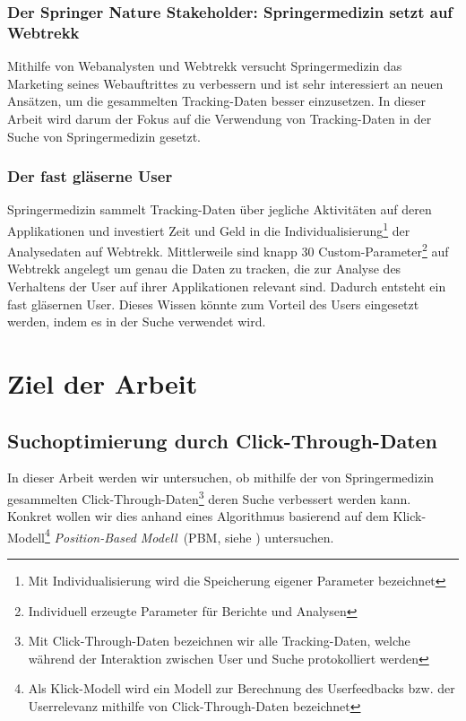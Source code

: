 \subsubsection{Der Springer Nature Stakeholder: Springermedizin setzt auf Webtrekk}
\label{sec:Einfuehrung:Problemstellung:Springermedizin}

Mithilfe von Webanalysten und Webtrekk versucht Springermedizin das Marketing seines Webauftrittes zu verbessern und ist sehr interessiert an neuen Ansätzen, um die gesammelten Tracking-Daten besser einzusetzen. In dieser Arbeit wird darum der Fokus auf die Verwendung von Tracking-Daten in der Suche von Springermedizin gesetzt. 
 
\subsubsection{Der fast gläserne User}
\label{sec:Einfuehrung:Problemstellung:Glaeserne-User}

Springermedizin sammelt Tracking-Daten über jegliche Aktivitäten auf deren Applikationen und investiert Zeit und Geld in die Individualisierung\footnote{Mit Individualisierung wird die Speicherung eigener Parameter bezeichnet} der Analysedaten auf Webtrekk. Mittlerweile sind knapp 30 Custom-Parameter\footnote{Individuell erzeugte Parameter für Berichte und Analysen} auf Webtrekk angelegt um genau die Daten zu tracken, die zur Analyse des Verhaltens der User auf ihrer Applikationen relevant sind. Dadurch entsteht ein fast \glqq gläsernen User\grqq{}. Dieses Wissen könnte zum Vorteil des Users eingesetzt werden, indem es in der Suche verwendet wird.

\pagebreak
\section{Ziel der Arbeit}
\label{sec:Einfuehrung:ZielArbeit}

\subsection{Suchoptimierung durch Click-Through-Daten}
\label{sec:Einfuehrung:ZielArbeit:Suchoptimierung}

In dieser Arbeit werden wir untersuchen, ob mithilfe der von Springermedizin gesammelten Click-Through-Daten\footnote{Mit Click-Through-Daten bezeichnen wir alle Tracking-Daten, welche während der Interaktion zwischen User und Suche protokolliert werden} deren Suche verbessert werden kann. Konkret wollen wir dies anhand eines Algorithmus basierend auf dem Klick-Modell\footnote{Als Klick-Modell wird ein Modell zur Berechnung des Userfeedbacks bzw. der Userrelevanz mithilfe von Click-Through-Daten bezeichnet} \textit{Position-Based Modell}~(PBM, siehe \cite{pbm}) untersuchen.

